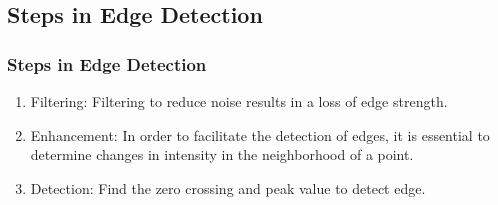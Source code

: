 \documentclass[notheorems,serif,table,compress]{beamer}  %
\begin{document}
\subsection{Steps in Edge Detection}

\begin{frame}
\frametitle{Steps in Edge Detection}
    \begin{enumerate}
        \item {\color{blue}Filtering:} Filtering to reduce noise results in a loss of edge strength.
        \item {\color{blue}Enhancement:} In order to facilitate the detection of edges, it is essential to determine changes in intensity in the neighborhood of a point. 
        \item {\color{blue}Detection:} Find the zero crossing and peak value to detect edge.
    \end{enumerate}
\end{frame}
\end{document}
